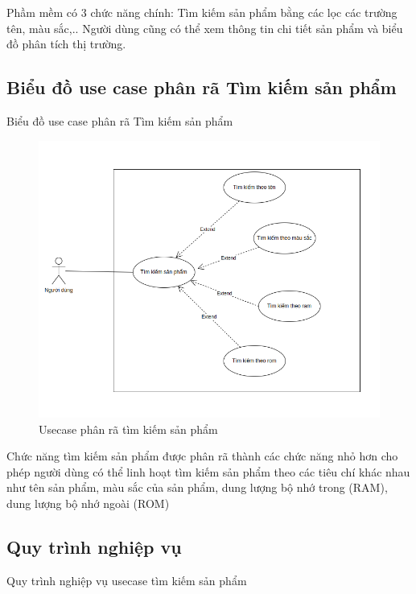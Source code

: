 \documentclass[../DoAn.tex]{subfiles}
\begin{document}
Phầm mềm có 3 chức năng chính: Tìm kiếm sản phẩm bằng các lọc các trường tên, màu sắc,.. Người dùng cũng có thể xem thông tin chi tiết sản phẩm và biểu đồ phân tích thị trường.
\subsection{Biểu đồ use case phân rã Tìm kiếm sản phẩm}
\label{subsection:2.2.2}
Biểu đồ use case phân rã Tìm kiếm sản phẩm

\begin{figure}[H]
    \centering
    \includegraphics[scale=0.55]{Hinhve/search.png}
    \caption{Usecase phân rã tìm kiếm sản phẩm}
    \label{fig:my_label2}
\end{figure}

Chức năng tìm kiếm sản phẩm được phân rã thành các chức năng nhỏ hơn cho phép người dùng có thể linh hoạt tìm kiếm sản phẩm theo các tiêu chí khác nhau như tên sản phẩm, màu sắc của sản phẩm, dung lượng bộ nhớ trong (RAM), dung lượng bộ nhớ ngoài (ROM) 

\subsection{Quy trình nghiệp vụ}
\label{subsection:2.2.3}
Quy trình nghiệp vụ usecase tìm kiếm sản phẩm
\end{document}
